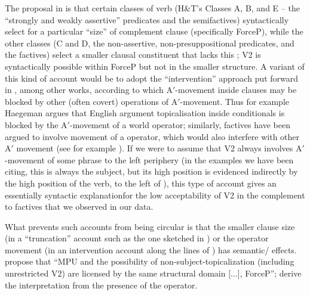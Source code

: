 \documentclass[output=paper]{langsci/langscibook}
\begin{document}
The proposal in \citet{WiklundEtAl2009} is that certain classes of verb (H\&T's Classes A, B, and E -- the ``strongly and weakly assertive'' predicates and the semifactives) syntactically select for a particular ``size'' of complement clause (specifically ForceP), while the other classes (C and D, the non-assertive, non-presuppositional predicates, and the factives) select a smaller clausal constituent that lacks this ; V2 is syntactically possible within ForceP but not in the smaller structure.  A variant of this kind of account would be to adopt the ``intervention'' approach put forward in \citet{Haegeman2010,Haegeman2012MCP}, among other works, according to which A$'$-movement inside clauses may be blocked by other (often covert) operations of A$'$-movement. Thus for example Haegeman argues that English argument topicalisation inside conditionals is blocked by the A$'$-movement of a world operator; similarly, factives have been argued to involve movement of a  operator, which would also interfere with other A$'$ movement (see for example \citealt{ZanuttiniPortner2003}). If we were to assume that V2 always involves A$'$-movement of some phrase to the left periphery (in the examples we have been citing, this is always the subject, but its high position is evidenced indirectly by the high position of the verb, to the left of ), this type of account gives an essentially syntactic explanation\largerpage for the low acceptability of V2 in the complement to factives that we observed in our data. %

What prevents such accounts from being circular is that the smaller clause size (in a ``truncation'' account such as the one sketched in \citealt{WiklundEtAl2009}) or the operator movement (in an intervention account along the lines of \citealt{ZanuttiniPortner2003,Haegeman2010,Haegeman2012MCP}) has semantic/ effects.  \citeauthor{WiklundEtAl2009}  propose that ``MPU and the possibility of non-subject-topicalization (including unrestricted V2) are licensed by the same structural domain [...], ForceP''; \citeauthor{ZanuttiniPortner2003} derive the  interpretation from the presence of the  operator.  
\end{document}
